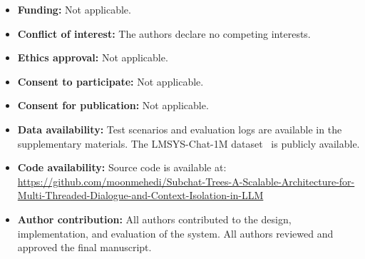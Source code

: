 \documentclass[pdflatex,sn-mathphys-num]{sn-jnl}%
\theoremstyle{thmstyleone}%
\theoremstyle{thmstyletwo}%
\theoremstyle{thmstylethree}%
\begin{document}
\begin{itemize}
\item \textbf{Funding:} Not applicable.
\item \textbf{Conflict of interest:} The authors declare no competing interests.
\item \textbf{Ethics approval:} Not applicable.
\item \textbf{Consent to participate:} Not applicable.
\item \textbf{Consent for publication:} Not applicable.
\item \textbf{Data availability:} Test scenarios and evaluation logs are available in the supplementary materials. The LMSYS-Chat-1M dataset~\cite{zheng2024lmsyschat} is publicly available.
\item \textbf{Code availability:} Source code is available at: \url{https://github.com/moonmehedi/Subchat-Trees-A-Scalable-Architecture-for-Multi-Threaded-Dialogue-and-Context-Isolation-in-LLM}
\item \textbf{Author contribution:} All authors contributed to the design, implementation, and evaluation of the system. All authors reviewed and approved the final manuscript.
\end{itemize}
\end{document}
